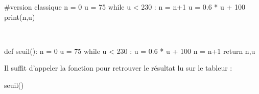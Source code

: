 \documentclass[a4paper,11pt]{article}
\begin{document}
\begin{cmanip}
\begin{enumerate}
\begin{enumerate}
	\begin{center}
		\begin{minipage}{0.45\linewidth}
			\begin{envpython}[7.5cm]
				#version classique
				n = 0
				u = 75
				while u < 230 :
					n = n+1
					u = 0.6 * u + 100
				print(n,u)
			\end{envpython}
		\end{minipage}
		\hfill~
		\begin{minipage}{0.45\linewidth}
			\begin{envpython}[7.5cm]
				def seuil():
					n = 0
					u = 75
					while u < 230 :
						u = 0.6 * u + 100
						n = n+1
					return n,u
			\end{envpython}
		\end{minipage}
	\end{center}
	
	Il suffit d'appeler la fonction  pour retrouver le résultat \og lu \fg{} sur le tableur :
	\begin{consolepython}[15cm]
		\begin{pyconsole}[][framesep=3mm,frame=single,label={[\scriptsize Début de la console \logopython]\scriptsize Fin de la console \logopython},fontsize=\footnotesize,framerule=1pt,rulecolor=\color{ForestGreen}]
			seuil()
		\end{pyconsole}
	\end{consolepython}
	\end{enumerate}
\end{enumerate}
\end{cmanip}
\end{document}
